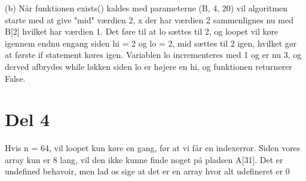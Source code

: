 \documentclass{report}
\begin{document}
(b) Når funktionen exists() kaldes med parameterne (B, 4, 20) vil algoritmen starte med at give "mid" værdien 2, x der har værdien 2 sammenlignes nu med B[2] hvilket har værdien 1. Det føre til at lo sættes til 2, og loopet vil køre igennem endnu engang siden hi = 2 og lo = 2, mid sættes til 2 igen, hvilket gør at første if statement køres igen. Variablen lo incrementeres med 1 og er nu 3, og derved afbrydes while løkken siden lo er højere en hi, og funktionen returnerer False.

\chapter{Del 4}

Hvis n = 64, vil loopet kun køre en gang, før at vi får en indexerror. Siden vores array kun er 8 lang, vil den ikke kunne finde noget på pladsen A[31]. Det er undefined behavoir, men lad os sige at det er en array hvor alt udefineret er 0
\end{document}
